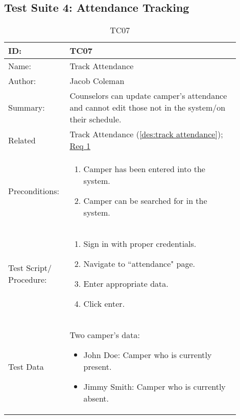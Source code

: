\documentclass[11pt]{article}
\begin{document}
\subsection*{Test Suite 4: Attendance Tracking}

\begin{table}[H]
\begin{center}
\caption{TC07}
\label{TC07}
\begin{tabular}{p{0.20\linewidth}p{0.70\linewidth}}
	ID: & TC07\\\hline
	Name: & Track Attendance \\\hline
	Author: & Jacob Coleman\\\hline
	Summary: & Counselors can update camper's attendance and cannot edit those not in the system/on their schedule. \\\hline
	Related \hspace{5em} & Track Attendance (\cref{des:track attendance}); \hyperlink{Req1}{Req 1}\\\hline
	Preconditions:& \begin{enumerate}[topsep=0pt] 
		\item Camper has been entered into the system.
		\item Camper can be searched for in the system.
	\end{enumerate}\\\hline
	Test Script/ Procedure: & \begin{enumerate}[topsep=0pt]
		\item Sign in with proper credentials.
		\item Navigate to ``attendance" page.
		\item Enter appropriate data.
		\item Click enter.
	\end{enumerate}\\\hline
	Test Data & \vspace*{.25em} Two camper's data:
	\begin{itemize}[topsep=0pt]
		\item John Doe: Camper who is currently present.
		\item Jimmy Smith: Camper who is currently absent.
	\end{itemize}
\end{tabular}
\end{center}
\end{table}
\end{document}

